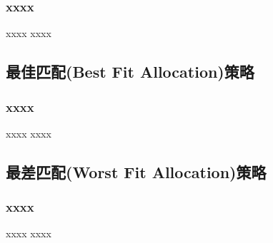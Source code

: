 \begin{frame}[plain,t]
    
    \frametitle{xxxx}
    
    
    \begin{block}{xxxx}
        xxxx

    \end{block} 
    
    
    \begin{figure}
        \centering
    \end{figure}
    
\end{frame}
\subsection{最佳匹配(Best Fit Allocation)策略} %

\begin{frame}[plain,t]
    
    \frametitle{xxxx}
    
    
    \begin{block}{xxxx}
        xxxx

    \end{block} 
    
    
    \begin{figure}
        \centering
    \end{figure}
    
\end{frame}
\subsection{最差匹配(Worst Fit Allocation)策略} %

\begin{frame}[plain,t]
    
    \frametitle{xxxx}
    
    
    \begin{block}{xxxx}
        xxxx

    \end{block} 
    
    
    \begin{figure}
        \centering
    \end{figure}
    
\end{frame}


